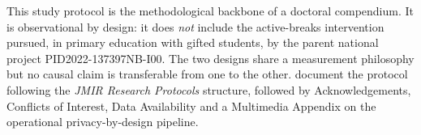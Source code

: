 This study protocol is the methodological backbone of a doctoral compendium. It is observational by design: it does \emph{not} include the active-breaks intervention pursued, in primary education with gifted students, by the parent national project PID2022-137397NB-I00. The two designs share a measurement philosophy but no causal claim is transferable from one to the other.  document the protocol following the \emph{JMIR Research Protocols} structure, followed by Acknowledgements, Conflicts of Interest, Data Availability and a Multimedia Appendix on the operational privacy-by-design pipeline.
